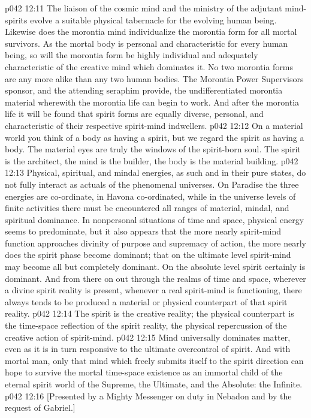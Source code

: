 \vs p042 12:11 The liaison of the cosmic mind and the ministry of the adjutant mind\hyp{}spirits evolve a suitable physical tabernacle for the evolving human being. Likewise does the morontia mind individualize the morontia form for all mortal survivors. As the mortal body is personal and characteristic for every human being, so will the morontia form be highly individual and adequately characteristic of the creative mind which dominates it. No two morontia forms are any more alike than any two human bodies. The Morontia Power Supervisors sponsor, and the attending seraphim provide, the undifferentiated morontia material wherewith the morontia life can begin to work. And after the morontia life it will be found that spirit forms are equally diverse, personal, and characteristic of their respective spirit\hyp{}mind indwellers.
\vs p042 12:12 \pc On a material world you think of a body as having a spirit, but we regard the spirit as having a body. The material eyes are truly the windows of the spirit\hyp{}born soul. The spirit is the architect, the mind is the builder, the body is the material building.
\vs p042 12:13 \pc Physical, spiritual, and mindal energies, as such and in their pure states, do not fully interact as actuals of the phenomenal universes. On Paradise the three energies are co\hyp{}ordinate, in Havona co\hyp{}ordinated, while in the universe levels of finite activities there must be encountered all ranges of material, mindal, and spiritual dominance. In nonpersonal situations of time and space, physical energy seems to predominate, but it also appears that the more nearly spirit\hyp{}mind function approaches divinity of purpose and supremacy of action, the more nearly does the spirit phase become dominant; that on the ultimate level spirit\hyp{}mind may become all but completely dominant. On the absolute level spirit certainly is dominant. And from there on out through the realms of time and space, wherever a divine spirit reality is present, whenever a real spirit\hyp{}mind is functioning, there always tends to be produced a material or physical counterpart of that spirit reality.
\vs p042 12:14 The spirit is the creative reality; the physical counterpart is the time\hyp{}space reflection of the spirit reality, the physical repercussion of the creative action of spirit\hyp{}mind.
\vs p042 12:15 Mind universally dominates matter, even as it is in turn responsive to the ultimate overcontrol of spirit. And with mortal man, only that mind which freely submits itself to the spirit direction can hope to survive the mortal time\hyp{}space existence as an immortal child of the eternal spirit world of the Supreme, the Ultimate, and the Absolute: the Infinite.
\vsetoff
\vs p042 12:16 [Presented by a Mighty Messenger on duty in Nebadon and by the request of Gabriel.]
